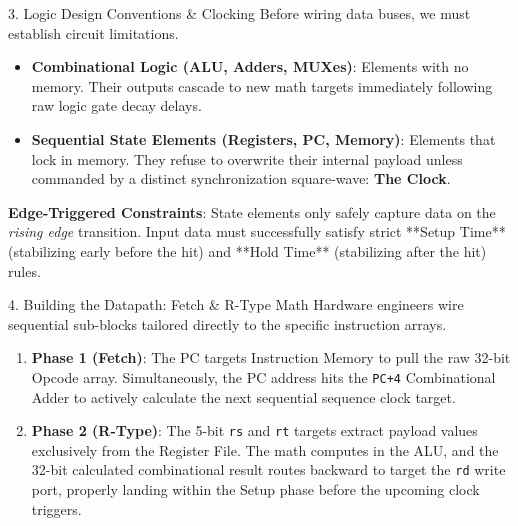 \documentclass[aspectratio=169]{beamer}
\begin{document}
\begin{frame}{3. Logic Design Conventions \& Clocking}
Before wiring data buses, we must establish circuit limitations.
\vspace{0.2cm}
\begin{itemize}
    \item \textbf{Combinational Logic (ALU, Adders, MUXes)}: Elements with no memory. Their outputs cascade to new math targets immediately following raw logic gate decay delays.
    \item \textbf{Sequential State Elements (Registers, PC, Memory)}: Elements that lock in memory. They refuse to overwrite their internal payload unless commanded by a distinct synchronization square-wave: \textbf{The Clock}.
\end{itemize}
\textbf{Edge-Triggered Constraints}: State elements only safely capture data on the \textit{rising edge} transition. Input data must successfully satisfy strict **Setup Time** (stabilizing early before the hit) and **Hold Time** (stabilizing after the hit) rules.
\end{frame}

\begin{frame}{4. Building the Datapath: Fetch \& R-Type Math}
Hardware engineers wire sequential sub-blocks tailored directly to the specific instruction arrays.
\vspace{0.2cm}
\begin{enumerate}
    \item \textbf{Phase 1 (Fetch)}: The PC targets Instruction Memory to pull the raw 32-bit Opcode array. Simultaneously, the PC address hits the \texttt{PC+4} Combinational Adder to actively calculate the next sequential sequence clock target.
    \item \textbf{Phase 2 (R-Type)}: The 5-bit \texttt{rs} and \texttt{rt} targets extract payload values exclusively from the Register File. The math computes in the ALU, and the 32-bit calculated combinational result routes backward to target the \texttt{rd} write port, properly landing within the Setup phase before the upcoming clock triggers.
\end{enumerate}
\end{frame}
\end{document}

